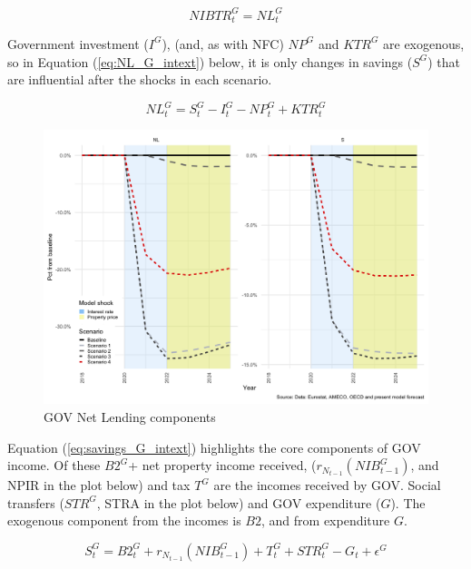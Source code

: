 \documentclass[
]{book}
\begin{document}
\begin{equation}
NIBTR^G_t = NL^G_t
\label{eq:nibtrg_intext}
\end{equation}

Government investment (\(I^G\)), (and, as with NFC) \(NP^G\) and \(KTR^G\) are exogenous, so in Equation (\ref{eq:NL_G_intext}) below, it is only changes in savings (\(S^G\)) that are influential after the shocks in each scenario.

\begin{equation}
NL^G_t = S^G_t - I^G_t - NP^G_t + KTR^G_t
\label{eq:NL_G_intext}
\end{equation}

\begin{figure}[H]
\includegraphics[width=0.95\linewidth]{figures/fl-fi-sfc-plot-GOV-indicators-nl-1} \caption{GOV Net Lending components}\label{fig:fl-fi-sfc-plot-GOV-indicators-nl}
\end{figure}

Equation (\ref{eq:savings_G_intext}) highlights the core components of GOV income. Of these \(B2^G\)+ net property income received, (\(r_{N_{t-1}}(NIB^G_{t-1})\), and NPIR in the plot below) and tax \(T^G\) are the incomes received by GOV. Social transfers (\(STR^G\), STRA in the plot below) and GOV expenditure (\(G\)). The exogenous component from the incomes is \(B2\), and from expenditure \(G\).

\begin{equation}
S^G_t= B2^G_t + r_{N_{t-1}}(NIB^G_{t-1}) + T^G_t+ STR^G_t - G_t + \epsilon ^G
\label{eq:savings_G_intext}
\end{equation}
\end{document}
